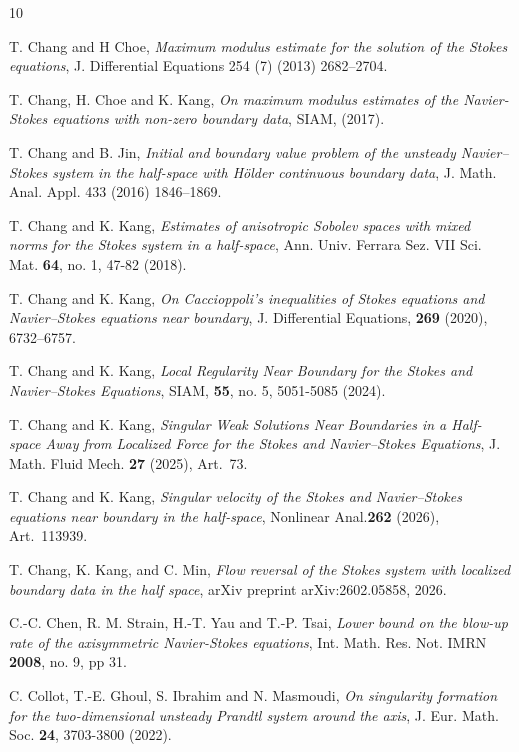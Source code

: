 \documentclass{amsart}
\numberwithin{equation}{section}
\begin{document}
 
\begin{thebibliography}{10}

 

 T. Chang and  H Choe, {\it  Maximum modulus estimate for the solution of the Stokes equations}, J. Differential Equations 
254 (7) (2013) 2682–2704.

 


 T. Chang, H. Choe and K. Kang, {\it On maximum modulus estimates of the Navier-Stokes equations with non-zero boundary data},  SIAM,   (2017).

 T. Chang and B. Jin, {\it   Initial and boundary value problem of the unsteady 
Navier–Stokes system in the half-space with Hölder continuous 
boundary data}, J. Math. Anal. Appl. 433 (2016) 1846–1869.

 T. Chang and K. Kang, {\it Estimates of anisotropic Sobolev spaces with mixed norms for the Stokes system in a half-space}, Ann. Univ. Ferrara Sez. VII Sci. Mat. {\bf  64},  no. 1, 47-82   (2018).

 T. Chang and K. Kang, {\it On Caccioppoli's inequalities of Stokes equations and Navier--Stokes equations near boundary},
J. Differential Equations, \textbf{269} (2020), 6732--6757.

 T. Chang and K. Kang, {\it Local Regularity Near Boundary for the Stokes and Navier–Stokes Equations},  SIAM, {\bf 55}, no. 5, 5051-5085  (2024).

 T. Chang and K. Kang, {\it Singular Weak Solutions Near Boundaries in a Half-space Away from Localized Force for the Stokes and Navier--Stokes Equations},
J. Math. Fluid Mech. \textbf{27} (2025), Art.~73.

 T. Chang and K. Kang, {\it Singular velocity of the Stokes and Navier--Stokes equations near boundary in the half-space},
Nonlinear Anal.\textbf{262} (2026), Art.~113939.

T. Chang, K. Kang, and C. Min,
\textit{Flow reversal of the Stokes system with localized boundary data in the half space},
arXiv preprint arXiv:2602.05858, 2026.

 C.-C. Chen, R. M. Strain, H.-T. Yau and T.-P. Tsai,
{\it Lower bound on the blow-up rate of the axisymmetric
Navier-Stokes equations}, Int. Math. Res. Not. IMRN  {\bf 2008}, no.
9, pp 31.

 C. Collot, T.-E. Ghoul,  S. Ibrahim  and N. Masmoudi, {\it On singularity formation for the two-dimensional unsteady Prandtl system around the axis}, J. Eur. Math. Soc. {\bf 24}, 3703-3800 (2022).


\end{thebibliography}
\end{document}
